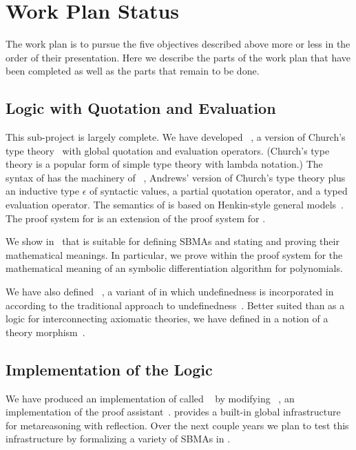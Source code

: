 \documentclass[fleqn]{llncs}
\begin{document}
\ei


\section{Work Plan Status}

The work plan is to pursue the five objectives described above more or less in
the order of their presentation.  Here we describe the parts of the work
plan that have been completed as well as the parts that remain to be done.

\subsection*{Logic with Quotation and Evaluation}

This sub-project is largely complete.  We have developed
{\churchqe}~\cite{Farmer18}, a version of Church's type
theory~\cite{Church40} with global quotation and evaluation operators.
(Church's type theory is a popular form of simple type theory with
lambda notation.)  The syntax of {\churchqe} has the machinery of
{\qzero}~\cite{Andrews02}, Andrews' version of Church's type theory
plus an inductive type $\epsilon$ of syntactic values, a partial
quotation operator, and a typed evaluation operator.  The semantics of
{\churchqe} is based on Henkin-style general models~\cite{Henkin50}.
The proof system for {\churchqe} is an extension of the proof system
for {\qzero}.

We show in~\cite{Farmer18} that {\churchqe} is suitable for defining
SBMAs and stating and proving their mathematical meanings.  In
particular, we prove within the proof system for {\churchqe} the
mathematical meaning of an symbolic differentiation algorithm for
polynomials.

We have also defined {\churchuqe}~\cite{Farmer17}, a variant of
{\churchqe} in which undefinedness is incorporated in {\churchqe}
according to the traditional approach to
undefinedness~\cite{Farmer04}.  Better suited than {\churchqe} as a
logic for interconnecting axiomatic theories, we have defined in
{\churchuqe} a notion of a theory morphism~\cite{Farmer17}.

\subsection*{Implementation of the Logic}

We have produced an implementation of {\churchqe} called
{\HLQE}~\cite{CaretteFarmerLaskowski18} by modifying
{\HL}~\cite{Harrison09}, an implementation of the {\HOL} proof
assistant~\cite{GordonMelham93}.  {\HLQE} provides a built-in global
infrastructure for metareasoning with reflection.  Over the next
couple years we plan to test this infrastructure by formalizing a
variety of SBMAs in {\HLQE}.
\end{document}
